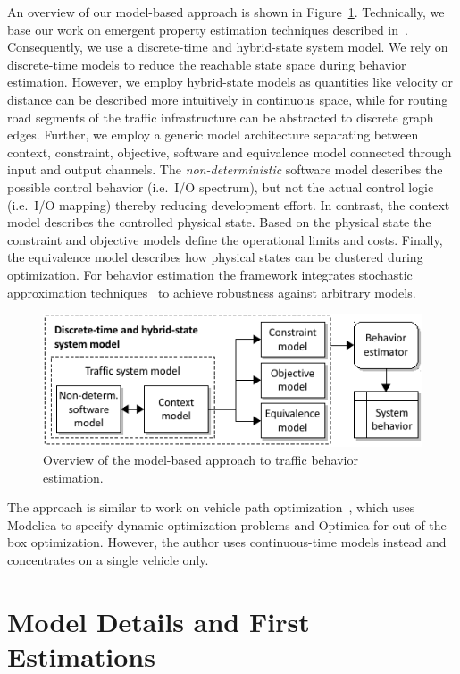 \documentclass[conference]{../cls/IEEEtran}
\begin{document}
An overview of our model-based approach is shown in Figure~\ref{fig:framework}. Technically, we base our work on emergent property estimation techniques described in~\cite{Hackenberg2012}. Consequently, we use a discrete-time and hybrid-state system model. We rely on discrete-time models to reduce the reachable state space during behavior estimation. However, we employ hybrid-state models as quantities like velocity or distance can be described more intuitively in continuous space, while for routing road segments of the traffic infrastructure can be abstracted to discrete graph edges. Further, we employ a generic model architecture separating between context, constraint, objective, software and equivalence model connected through input and output channels. The \textit{non-deterministic} software model describes the possible control behavior (i.e.\ I/O spectrum), but not the actual control logic (i.e.\ I/O mapping) thereby reducing development effort. In contrast, the context model describes the controlled physical state. Based on the physical state the constraint and objective models define the operational limits and costs. Finally, the equivalence model describes how physical states can be clustered during optimization. For behavior estimation the framework integrates stochastic approximation techniques~\cite{Pereira1991} to achieve robustness against arbitrary models.

\begin{figure}[h]
	\centering
	\includegraphics{../gfx/framework.pdf}
	\caption{Overview of the model-based approach to traffic behavior estimation.}
	\label{fig:framework}
\end{figure}

The approach is similar to work on vehicle path optimization~\cite{Danielsson2007}, which uses Modelica to specify dynamic optimization problems and Optimica for out-of-the-box optimization. However, the author uses continuous-time models instead and concentrates on a single vehicle only.

\section{Model Details and First Estimations}
\end{document}

